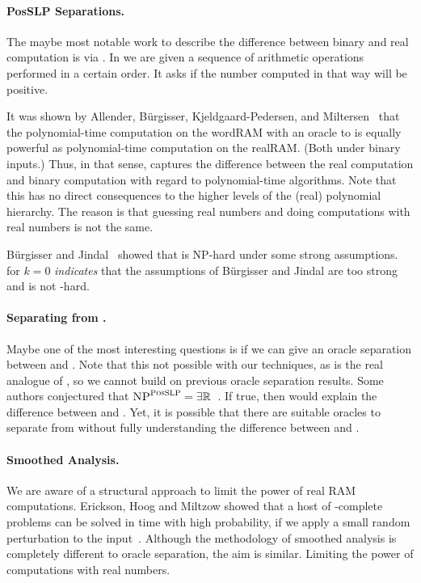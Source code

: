 \documentclass{article}
\begin{document}
\paragraph{PosSLP Separations.}
    The maybe most notable work to describe the difference between binary and real computation is via \PosSLP.
    In \PosSLP we are given a sequence of arithmetic operations
    performed in a certain order. 
    It asks if the number computed in that way will be positive.

    It was shown by Allender, B\"{u}rgisser, 
    Kjeldgaard-Pedersen, and Miltersen~\cite{ABKPM08}
    that the polynomial-time computation on the wordRAM with an oracle to \PosSLP is equally powerful as polynomial-time computation on the realRAM.
    (Both under binary inputs.)
    Thus, in that sense, \PosSLP captures the difference between the real computation and binary computation with regard to polynomial-time algorithms.
    Note that this has no direct consequences to the higher levels of the (real) polynomial hierarchy.
    The reason is that guessing real numbers and doing computations with real numbers is not the same.
    
    B\"{u}rgisser and Jindal~\cite{BJ24} showed that \PosSLP is NP-hard under some strong assumptions.
     for $k=0$
    \textit{indicates} that the assumptions of B\"{u}rgisser 
    and Jindal are too strong and \PosSLP is not \NP-hard.

\paragraph{Separating \NP from \ER.}
    Maybe one of the most interesting questions is if we can give an oracle separation between \NP and \ER. 
    Note that this not possible with our techniques, as \ER is the real analogue of \NP, 
    so we cannot build on previous oracle separation results.
% 
    Some authors conjectured that $\textsc{NP}^\textsc{PosSLP} = \exists\mathbb{R}$~\cite{ERcompendium}.
    If true, then \PosSLP would explain the difference between \NP and \ER.
% 
    Yet, it is possible that there are suitable oracles to separate \NP from \ER without fully understanding the difference between \NP and \ER.

\paragraph{Smoothed Analysis.}
    We are aware of a structural approach to limit the power of real RAM computations.
    Erickson, Hoog and Miltzow showed that a host of \ER-complete problems can be solved in \NP time with high probability, if we apply a small random perturbation to the input~\cite{EvdHM20}.
    Although the methodology of smoothed analysis is completely different to oracle separation, the aim is similar. 
    Limiting the power of computations with real numbers.
\end{document}
